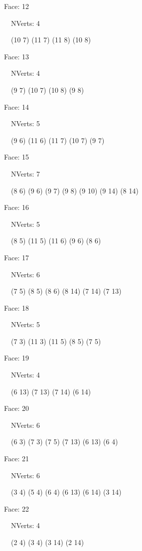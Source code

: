 \documentclass{article}
\begin{document}
{\footnotesize 

Face: 12

\   \    NVerts: 4

 \   \   (10 7) (11 7) (11 8) (10 8)}

{\footnotesize 

Face: 13

\   \    NVerts: 4

 \   \   (9 7) (10 7) (10 8) (9 8)}

{\footnotesize 

Face: 14

\   \    NVerts: 5

 \   \   (9 6) (11 6) (11 7) (10 7) (9 7)}

{\footnotesize 

Face: 15

\   \    NVerts: 7

 \   \   (8 6) (9 6) (9 7) (9 8) (9 10) (9 14) (8 14)}

{\footnotesize 

Face: 16

\   \    NVerts: 5

 \   \   (8 5) (11 5) (11 6) (9 6) (8 6)}

{\footnotesize 

Face: 17

\   \    NVerts: 6

 \   \   (7 5) (8 5) (8 6) (8 14) (7 14) (7 13)}

{\footnotesize 

Face: 18

\   \    NVerts: 5

 \   \   (7 3) (11 3) (11 5) (8 5) (7 5)}

{\footnotesize 

Face: 19

\   \    NVerts: 4

 \   \   (6 13) (7 13) (7 14) (6 14)}

{\footnotesize 

Face: 20

\   \    NVerts: 6

 \   \   (6 3) (7 3) (7 5) (7 13) (6 13) (6 4)}

{\footnotesize 

Face: 21

\   \    NVerts: 6

 \   \   (3 4) (5 4) (6 4) (6 13) (6 14) (3 14)}

{\footnotesize 

Face: 22

\   \    NVerts: 4

 \   \   (2 4) (3 4) (3 14) (2 14)}
\end{document}
